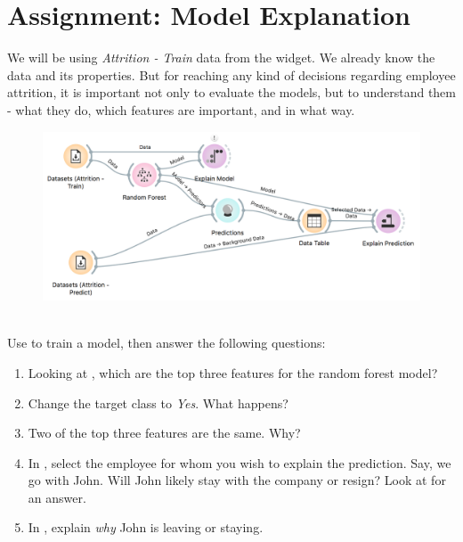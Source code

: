 \chapter{Assignment: Model Explanation}
\label{hw:model-explanation}

 We will be using \textit{Attrition - Train} data from the  widget. We already know the data and its properties. But for reaching any kind of decisions regarding employee attrition, it is important not only to evaluate the models, but to understand them - what they do, which features are important, and in what way.

\begin{figure}[h]
  \centering
  \includegraphics[width=\linewidth]{workflow.png}%
  \caption{$\;$}
\end{figure}

Use  to train a model, then answer the following questions:
\begin{enumerate}
    \item Looking at , which are the top three features for the random forest model?
    \item Change the target class to \textit{Yes}. What happens?
    \item Two of the top three features are the same. Why?
    \item In , select the employee for whom you wish to explain the prediction. Say, we go with John. Will John likely stay with the company or resign? Look at  for an answer.
    \item In , explain \emph{why} John is leaving or staying.
\end{enumerate}
